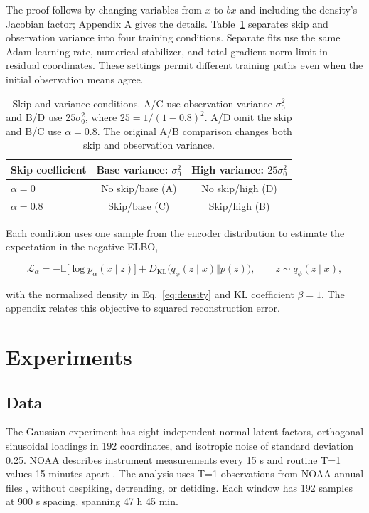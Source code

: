\documentclass{article}
\newcommand{\E}{\mathbb{E}}
\newcommand{\KL}{D_{\mathrm{KL}}}
\begin{document}
The proof follows by changing variables from $x$ to $bx$ and including the density's Jacobian factor; Appendix A gives the details. Table~\ref{tab:conditions} separates skip and observation variance into four training conditions. Separate fits use the same Adam learning rate, numerical stabilizer, and total gradient norm limit in residual coordinates. These settings permit different training paths even when the initial observation means agree.

\begin{table}[t]
\centering
\caption{Skip and variance conditions. A/C use observation variance $\sigma_0^2$ and B/D use $25\sigma_0^2$, where $25=1/(1-0.8)^2$. A/D omit the skip and B/C use $\alpha=0.8$. The original A/B comparison changes both skip and observation variance.}
\label{tab:conditions}
\begin{tabular}{lcc}
\toprule
Skip coefficient & Base variance: $\sigma_0^2$ & High variance: $25\sigma_0^2$\\
\midrule
$\alpha=0$ & No skip/base (A) & No skip/high (D)\\
$\alpha=0.8$ & Skip/base (C) & Skip/high (B)\\
\bottomrule
\end{tabular}
\end{table}

Each condition uses one sample from the encoder distribution to estimate the expectation in the negative ELBO,

\begin{equation}
\mathcal{L}_\alpha
=-\E\bigl[\log p_\alpha(x\mid z)\bigr]+\KL\bigl(q_\phi(z\mid x)\Vert p(z)\bigr),
\qquad z\sim q_\phi(z\mid x),
\label{eq:objective}
\end{equation}

with the normalized density in Eq.~\ref{eq:density} and KL coefficient $\beta=1$. The appendix relates this objective to squared reconstruction error.

\section{Experiments}
\subsection{Data}
The Gaussian experiment has eight independent normal latent factors, orthogonal sinusoidal loadings in 192 coordinates, and isotropic noise of standard deviation 0.25. NOAA describes instrument measurements every 15 s and routine T=1 values 15 minutes apart \citep{NDBCDARTDescription,Meinig2005DARTII,NDBC2023WebDataGuide}. The analysis uses T=1 observations from NOAA annual files \citep{NDBCDARTHistoricalData}, without despiking, detrending, or detiding. Each window has 192 samples at 900 s spacing, spanning 47 h 45 min.
\end{document}
